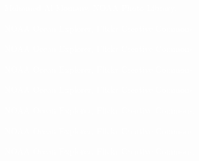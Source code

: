 \documentclass[t]{beamer}
\begin{document}
{
\begin{frame}[t]
\end{frame}
}

{
\begin{frame}[b]
\tiny\textcolor{white}{Mohamed Al Momany, NOAA Photo Library.}
\end{frame}
}

{
\begin{frame}[b]
\tiny\textcolor{white}{NOAA Ocean Explorer, Flickr Creative Commons.}
\end{frame}
}



{
\begin{frame}[b]
\tiny\textcolor{white}{NOAA Ocean Explorer, Flickr Creative Commons.}
\end{frame}
}

{
\begin{frame}[b]
\tiny\hfill\textcolor{white}{NOAA Ocean Explorer, Flickr Creative Commons.}
\end{frame}
}

{
\begin{frame}[b]
\tiny\hfill\textcolor{white}{NOAA Ocean Explorer, Flickr Creative Commons.}
\end{frame}
}

{
\begin{frame}[b]
\tiny\hfill\textcolor{white}{NOAA Ocean Explorer, Flickr Creative Commons.}
\end{frame}
}

{
\begin{frame}[b]
\tiny\hfill\textcolor{white}{NOAA Ocean Explorer, Flickr Creative Commons.}
\end{frame}
}

{
\begin{frame}[b]
\tiny\textcolor{white}{NOAA Ocean Explorer, Flickr Creative Commons.}
\end{frame}
}
\end{document}
